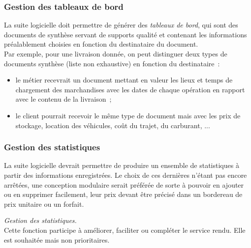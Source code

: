 \subsubsection{Gestion des tableaux de bord}
La suite logicielle doit permettre de générer des \emph{tableaux de bord}, qui sont des documents de synthèse servant de supports qualité et contenant les informations préalablement choisies en fonction du destinataire du document.
\\
Par exemple, pour une livraison donnée, on peut distinguer deux types de documents synthèse (liste non exhaustive) en fonction du destinataire~:
\begin{itemize}
	\item le métier recevrait un document mettant en valeur les lieux et temps de chargement des marchandises avec les dates de chaque opération en rapport avec le contenu de la livraison~;
	\item le client pourrait recevoir le même type de document mais avec les prix de stockage, location des véhicules, coût du trajet, du carburant, ...
\end{itemize}

\subsubsection{Gestion des statistiques}
La suite logicielle devrait permettre de produire un ensemble de statistiques à partir des informations enregistrées.
Le choix de ces dernières n'étant pas encore arrêtées, une conception modulaire serait préférée de sorte à pouvoir en ajouter ou en supprimer facilement, leur prix devant être précisé dans un bordereau de prix unitaire ou un forfait.
\begin{notation}
	\emph{Gestion des statistiques.}
	\\
	Cette fonction participe à améliorer, faciliter ou compléter le service rendu.
	Elle est souhaitée mais non prioritaires.
\end{notation}

